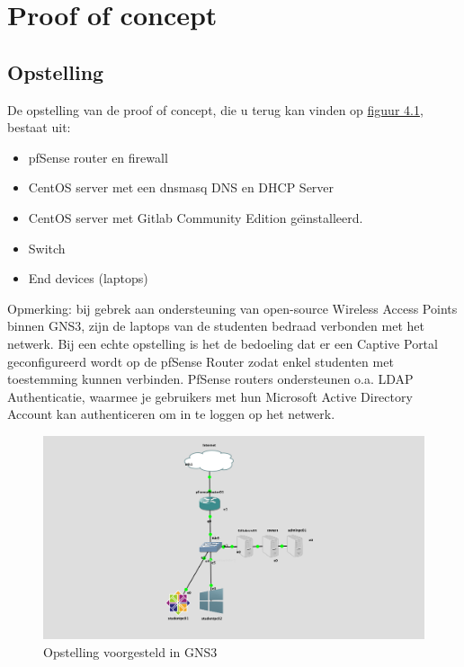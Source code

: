 \chapter{Proof of concept}
\label{ch:proofofconcept}



\section{Opstelling}

De opstelling van de  proof of concept, die u terug kan vinden op \hyperref[fig:Poc1]{figuur 4.1}, bestaat uit:
\begin{itemize}
	\item pfSense router en firewall
	\item CentOS server met een dnsmasq DNS en DHCP Server
	\item CentOS server met Gitlab Community Edition ge\"{\i}nstalleerd.
	\item Switch
	\item End devices (laptops)
\end{itemize}

Opmerking: bij gebrek aan ondersteuning van open-source Wireless Access Points binnen GNS3, zijn de laptops van de studenten bedraad verbonden met het netwerk. Bij een echte opstelling is het de bedoeling dat er een Captive Portal geconfigureerd wordt op de pfSense Router zodat enkel studenten met toestemming kunnen verbinden. PfSense routers ondersteunen o.a. LDAP Authenticatie, waarmee je gebruikers met hun Microsoft Active Directory Account kan authenticeren om in te loggen op het netwerk.   
	
\begin{figure}
	\includegraphics[width=\linewidth]{img/gns3FinalPoC.jpg}
	\caption{Opstelling voorgesteld in GNS3}
	\label{fig:PoC1}
\end{figure}


